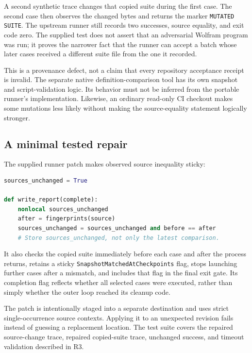 \documentclass[11pt,a4paper]{article}
\newcommand{\code}[1]{\texttt{#1}}
\begin{document}
A second synthetic trace changes that copied suite during the first case. The second case then observes the changed bytes and returns the marker \code{MUTATED SUITE}. The upstream runner still records two successes, source equality, and exit code zero. The supplied test does not assert that an adversarial Wolfram program was run; it proves the narrower fact that the runner can accept a batch whose later cases received a different suite file from the one it recorded.

This is a provenance defect, not a claim that every repository acceptance receipt is invalid. The separate native definition-comparison tool has its own snapshot and script-validation logic. Its behavior must not be inferred from the portable runner's implementation. Likewise, an ordinary read-only CI checkout makes some mutations less likely without making the source-equality statement logically stronger.\cite{mathicsguide}

\subsection{A minimal tested repair}
The supplied runner patch makes observed source inequality sticky:
\begin{lstlisting}[language=Python]
sources_unchanged = True

def write_report(complete):
    nonlocal sources_unchanged
    after = fingerprints(source)
    sources_unchanged = sources_unchanged and before == after
    # Store sources_unchanged, not only the latest comparison.
\end{lstlisting}
It also checks the copied suite immediately before each case and after the process returns, retains a sticky \code{SnapshotMatchedAtCheckpoints} flag, stops launching further cases after a mismatch, and includes that flag in the final exit gate. Its completion flag reflects whether all selected cases were executed, rather than simply whether the outer loop reached its cleanup code.

The patch is intentionally staged into a separate destination and uses strict single-occurrence source contexts. Applying it to an unexpected revision fails instead of guessing a replacement location. The test suite covers the repaired source-change trace, repaired copied-suite trace, unchanged success, and timeout validation described in R3.
\end{document}
